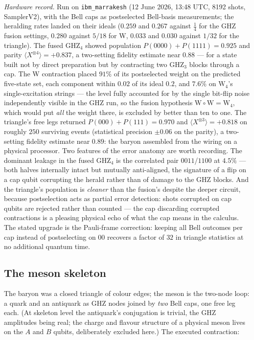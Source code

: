 \emph{Hardware record.} Run on \texttt{ibm\_marrakesh} (12 June 2026, 13:48 UTC, 8192 shots,
SamplerV2), with the Bell caps as postselected Bell-basis measurements; the heralding rates landed
on their ideals ($0.259$ and $0.267$ against $\tfrac14$ for the GHZ fusion settings, $0.280$
against $5/18$ for W, $0.033$ and $0.030$ against $1/32$ for the triangle). The fused GHZ$_4$
showed population $P(0000)+P(1111) = 0.925$ and parity
$\langle X^{\otimes4}\rangle = +0.837$, a two-setting fidelity estimate near $0.88$ --- for a
state built not by direct preparation but by contracting two GHZ$_3$ blocks through a cap. The W
contraction placed $91\%$ of its postselected weight on the predicted five-state set, each
component within $0.02$ of its ideal $0.2$, and $7.6\%$ on $\mathrm{W}_4$'s single-excitation
strings --- the level fully accounted for by the single bit-flip noise independently visible in
the GHZ run, so the fusion hypothesis $\mathrm{W}\circ\mathrm{W} = \mathrm{W}_4$, which would put
\emph{all} the weight there, is excluded by better than ten to one. The triangle's free legs
returned $P(000)+P(111) = 0.970$ and $\langle X^{\otimes3}\rangle = +0.818$ on roughly $250$
surviving events (statistical precision $\pm0.06$ on the parity), a two-setting fidelity estimate
near $0.89$: the baryon assembled from the wiring on a physical processor. Two features of the
error anatomy are worth recording. The dominant leakage in the fused GHZ$_4$ is the correlated
pair $0011$/$1100$ at $4.5\%$ --- both halves internally intact but mutually anti-aligned, the
signature of a flip on a cap qubit corrupting the herald rather than of damage to the GHZ blocks.
And the triangle's population is \emph{cleaner} than the fusion's despite the deeper circuit,
because postselection acts as partial error detection: shots corrupted on cap qubits are rejected
rather than counted --- the cap discarding corrupted contractions is a pleasing physical echo of
what the cap means in the calculus. The stated upgrade is the Pauli-frame correction: keeping all
Bell outcomes per cap instead of postselecting on $00$ recovers a factor of $32$ in triangle
statistics at no additional quantum time.

\subsection{The meson skeleton}
\label{app:qiskit-meson}

The baryon was a closed triangle of colour edges; the meson is the two-node loop: a quark and an
antiquark as GHZ nodes joined by \emph{two} Bell caps, one free leg each. (At skeleton level the
antiquark's conjugation is trivial, the GHZ amplitudes being real; the charge and flavour structure
of a physical meson lives on the $A$ and $B$ qubits, deliberately excluded here.) The executed
contraction:


